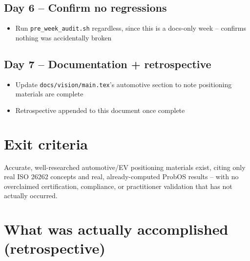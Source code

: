 \documentclass[11pt]{article}
\begin{document}
\subsection*{Day 6 -- Confirm no regressions}
\begin{itemize}[leftmargin=*]
  \item Run \texttt{pre\_week\_audit.sh} regardless, since this is a
    docs-only week -- confirms nothing was accidentally broken
\end{itemize}

\subsection*{Day 7 -- Documentation + retrospective}
\begin{itemize}[leftmargin=*]
  \item Update \texttt{docs/vision/main.tex}'s automotive section to
    note positioning materials are complete
  \item Retrospective appended to this document once complete
\end{itemize}

\section*{Exit criteria}
Accurate, well-researched automotive/EV positioning materials exist,
citing only real ISO 26262 concepts and real, already-computed ProbOS
results -- with no overclaimed certification, compliance, or
practitioner validation that has not actually occurred.


\section*{What was actually accomplished (retrospective)}
\end{document}
